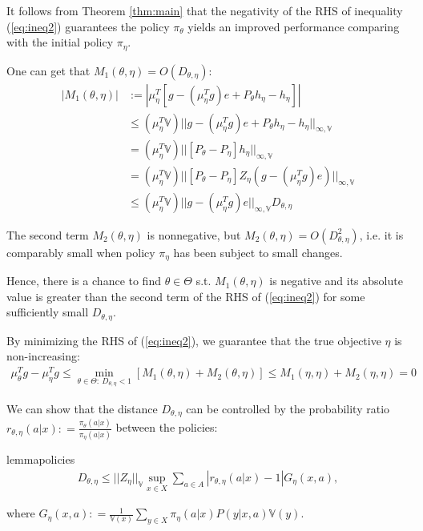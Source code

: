 \documentclass[11pt]{article}
\newcommand{\V}{\mathbb{V}}
\theoremstyle{definition}
\numberwithin{equation}{section}
\begin{document}
It follows from Theorem \ref{thm:main} that the negativity of the RHS of inequality (\ref{eq:ineq2}) guarantees the policy $\pi_\theta$ yields an improved performance comparing with the initial policy $\pi_{\eta}.$ 

One can get that $M_1(\theta, \eta) =O(D_{\theta, \eta})$:
\begin{align*}
|M_1(\theta, \eta)| &:= \left|\mu_{\eta}^T[ g -(\mu_\eta^Tg) e   +P_{\theta}h_{\eta} - h_{\eta} ] \right|\\
 &\leq (\mu_{\eta}^T\V)|| g - (\mu_\eta^Tg) e  +P_{\theta}h_{\eta} - h_{\eta } ||_{\infty, \V}\\
& =  (\mu_{\eta}^T\V)|| [P_{\theta} - P_{\eta}]h_{\eta} ||_{\infty, \V}\\
&= (\mu_{\eta}^T\V)|| [P_{\theta} - P_{\eta}] Z_{\eta}\left (g- (\mu_\eta^Tg) e\right) ||_{\infty, \V}\\
&\leq (\mu_{\eta}^T\V )|| g -(\mu_\eta^Tg) e ||_{\infty, \V} D_{\theta, \eta}
\end{align*}

The second term  $M_2(\theta, \eta)$ is nonnegative, but $M_2(\theta, \eta) = O(D_{\theta, \eta}^2)$, i.e. it is comparably small when policy $\pi_\eta$ has been subject to small changes.   
 
 Hence, there is a chance  to find $\theta\in \Theta$ s.t. $M_1(\theta, \eta) $ is negative and its absolute value is greater than the second term of the RHS of (\ref{eq:ineq2}) for some sufficiently  small $D_{\theta ,\eta}$. 

By minimizing  the RHS of (\ref{eq:ineq2}), we guarantee that the true objective $\eta$ is non-increasing:
\begin{align} 
\mu_\theta^Tg- \mu_\eta^Tg \leq  \min\limits_{\theta \in \Theta: ~D_{\theta, \eta}<1}[M_1(\theta, \eta) +M_2(\theta, \eta)] \leq M_1(\eta, \eta) +M_2(\eta, \eta) = 0
\end{align}


We can show that the distance $D_{\theta, \eta}$ can be controlled by the probability ratio 
$
r_{\theta, \eta}(a|x): =\frac{\pi_\theta(a|x)}{ \pi_{\eta}(a|x)}
$ between the policies:
\begin{restatable}{lemma}{policies}\label{lem:policies}
   \begin{align*}
D_{\theta, \eta} \leq   ||Z_{\eta}||_\V\sup\limits_{x\in X}    \sum\limits_{a\in A} \left| r_{\theta, \eta}(a|x)-  1 \right|    G_{\eta}(x, a),
\end{align*}

where $G_{\eta}(x, a): =   \frac{1}{\V(x)} \sum\limits_{y\in X}  \pi_{\eta}(a|x) P(y|x, a) \V(y)  .$

\end{restatable}
\end{document}
